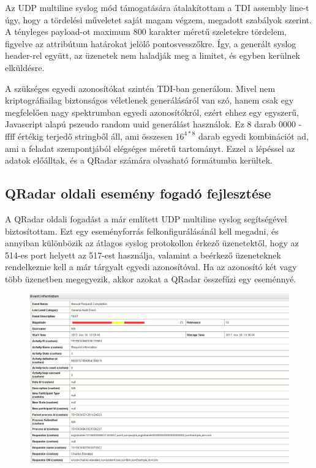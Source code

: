 Az UDP multiline syslog mód támogatására átalakítottam a TDI assembly line-t úgy, hogy a tördelési műveletet saját magam végzem, megadott szabályok szerint. A tényleges payload-ot maximum 800 karakter méretű szeletekre tördelem, figyelve az attribútum határokat jelölő pontosvesszőkre. Így, a generált syslog header-rel együtt, az üzenetek nem haladják meg a limitet, és egyben kerülnek elküldésre. 

A szükséges egyedi azonosítókat szintén TDI-ban generálom. Mivel nem kriptográfiailag biztonságos véletlenek generálásáról van szó, hanem csak egy megfelelően nagy spektrumban egyedi azonosítókról, ezért ehhez egy egyszerű, Javascript alapú pszeudo random uuid generálást használok. Ez 8 darab 0000 - ffff értékig terjedő stringből áll, ami összesen $16^{4 * 8} $ darab egyedi kombinációt ad, ami a feladat szempontjából elégséges méretű tartományt. Ezzel a lépéssel az adatok előálltak, és a QRadar számára olvasható formátumba kerültek.


\subsection{QRadar oldali esemény fogadó fejlesztése}

A QRadar oldali fogadást a már említett UDP multiline syslog segítségével biztosítottam. Ezt egy eseményforrás felkonfigurálásánál kell megadni, és annyiban különbözik az átlagos syslog protokollon érkező üzenetektől, hogy az 514-es port helyett az 517-est használja, valamint a beérkező üzeneteknek rendelkeznie kell a már tárgyalt egyedi azonosítóval. Ha az azonosító két vagy több üzenetben megegyezik, akkor azokat a QRadar összefűzi egy eseménnyé.
\begin{figure}
	\centering
	\includegraphics[width=0.7\linewidth]{figures/qradarproperties}
	\caption[Egy feldolgozott esemény a QRadar felületén]{}
	\label{fig:qradarproperties}
\end{figure}

